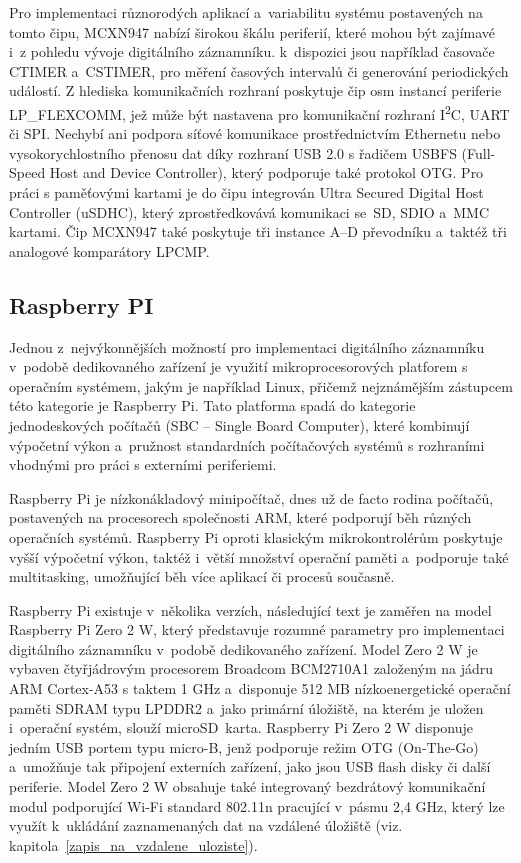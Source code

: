 Pro implementaci různorodých aplikací a~variabilitu systému postavených na tomto čipu, MCXN947 nabízí širokou škálu periferií, které mohou být zajímavé i~z pohledu vývoje digitálního záznamníku. k~dispozici jsou například časovače CTIMER a~CSTIMER, pro měření časových intervalů či generování periodických událostí. Z hlediska komunikačních rozhraní poskytuje čip osm instancí periferie LP\_FLEXCOMM, jež může být nastavena pro komunikační rozhraní I\textsuperscript{2}C, UART či SPI. Nechybí ani podpora síťové komunikace prostřednictvím Ethernetu nebo vysokorychlostního přenosu dat díky rozhraní USB 2.0 s řadičem USBFS (Full-Speed Host and Device Controller), který podporuje také protokol OTG. Pro práci s paměťovými kartami je do čipu integrován Ultra Secured Digital Host Controller (uSDHC), který zprostředkovává komunikaci se~SD, SDIO a~MMC kartami. Čip MCXN947 také poskytuje tři instance A--D převodníku a~taktéž tři analogové komparátory LPCMP.~\cite{nxp_MCX_Nx4x_Reference_Manual}

\subsection{Raspberry PI}
Jednou z~nejvýkonnějších možností pro implementaci digitálního záznamníku v~podobě dedikovaného zařízení je využití mikroprocesorových platforem s operačním systémem, jakým je například Linux, přičemž nejznámějším zástupcem této kategorie je Raspberry Pi. Tato platforma spadá do kategorie jednodeskových počítačů (SBC -- Single Board Computer), které kombinují výpočetní výkon a~pružnost standardních počítačových systémů s rozhraními vhodnými pro práci s externími periferiemi.~\cite{raspberry_pi_pico_2w}

Raspberry Pi je nízkonákladový minipočítač, dnes už de facto rodina počítačů, postavených na procesorech společnosti ARM, které podporují běh různých operačních systémů. Raspberry Pi oproti klasickým mikrokontrolérům poskytuje vyšší výpočetní výkon, taktéž i~větší množství operační paměti a~podporuje také multitasking, umožňující běh více aplikací či procesů současně.~\cite{raspberry_pi_pico_2w}

Raspberry Pi existuje v~několika verzích, následující text je zaměřen na model Raspberry Pi Zero 2 W, který představuje rozumné parametry pro implementaci digitálního záznamníku v~podobě dedikovaného zařízení. Model Zero 2 W je vybaven čtyřjádrovým procesorem Broadcom BCM2710A1 založeným na jádru ARM Cortex-A53 s taktem 1 GHz a~disponuje 512 MB nízkoenergetické operační paměti SDRAM typu LPDDR2 a~jako primární úložiště, na kterém je uložen i~operační systém, slouží microSD~karta. Raspberry Pi Zero 2 W disponuje jedním USB portem typu micro-B, jenž podporuje režim OTG (On-The-Go) a~umožňuje tak připojení externích zařízení, jako jsou USB flash disky či další periferie. Model Zero 2 W obsahuje také integrovaný bezdrátový komunikační modul podporující Wi-Fi standard 802.11n pracující v~pásmu 2,4 GHz, který lze využít k~ukládání zaznamenaných dat na vzdálené úložiště (viz. kapitola~\ref{zapis_na_vzdalene_uloziste}).~\cite{raspberry_pi_pico_2w}

